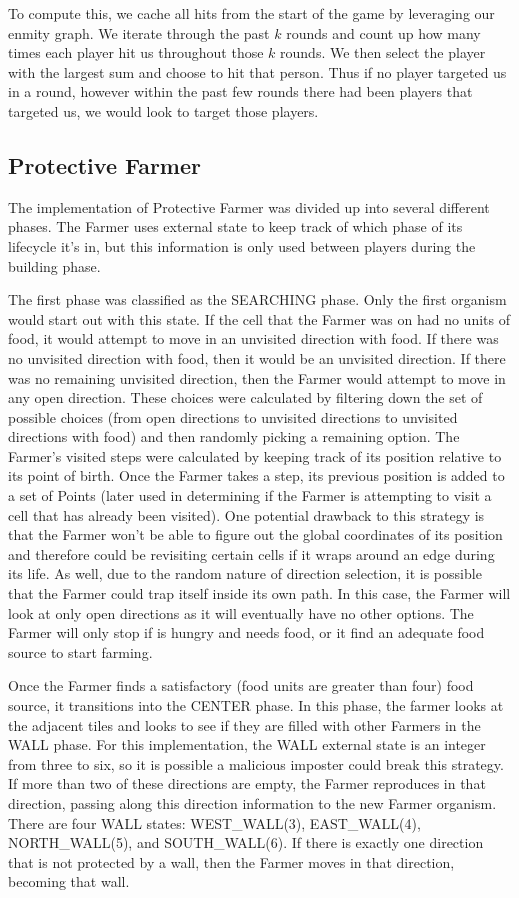 \documentclass[
10pt, %
letterpaper, %
oneside, %
headinclude,footinclude, %
english
]{article}
\begin{document}
To compute this, we cache all hits from the start of the game by leveraging our enmity graph. We iterate through the past $k$ rounds and count up how many times each player hit us throughout those $k$ rounds. We then select the player with the largest sum and choose to hit that person. Thus if no player targeted us in a round, however within the past few rounds there had been players that targeted us, we would look to target those players.

\subsection{Protective Farmer}
The implementation of Protective Farmer was divided up into several different phases. The Farmer uses external state to keep track of which phase of its lifecycle it's in, but this information is only used between players during the building phase.

The first phase was classified as the SEARCHING phase. Only the first organism would start out with this state. If the cell that the Farmer was on had no units of food, it would attempt to move in an unvisited direction with food. If there was no unvisited direction with food, then it would be an unvisited direction. If there was no remaining unvisited direction, then the Farmer would attempt to move in any open direction. These choices were calculated by filtering down the set of possible choices (from open directions to unvisited directions to unvisited directions with food) and then randomly picking a remaining option. The Farmer's visited steps were calculated by keeping track of its position relative to its point of birth. Once the Farmer takes a step, its previous position is added to a set of Points (later used in determining if the Farmer is attempting to visit a cell that has already been visited). One potential drawback to this strategy is that the Farmer won't be able to figure out the global coordinates of its position and therefore could be revisiting certain cells if it wraps around an edge during its life. As well, due to the random nature of direction selection, it is possible that the Farmer could trap itself inside its own path. In this case, the Farmer will look at only open directions as it will eventually have no other options. The Farmer will only stop if is hungry and needs food, or it find an adequate food source to start farming.

Once the Farmer finds a satisfactory (food units are greater than four) food source, it transitions into the CENTER phase. In this phase, the farmer looks at the adjacent tiles and looks to see if they are filled with other Farmers in the WALL phase. For this implementation, the WALL external state is an integer from three to six, so it is possible a malicious imposter could break this strategy. If more than two of these directions are empty, the Farmer reproduces in that direction, passing along this direction information to the new Farmer organism. There are four WALL states: WEST\_WALL(3), EAST\_WALL(4), NORTH\_WALL(5), and SOUTH\_WALL(6). If there is exactly one direction that is not protected by a wall, then the Farmer moves in that direction, becoming that wall.
\end{document}
